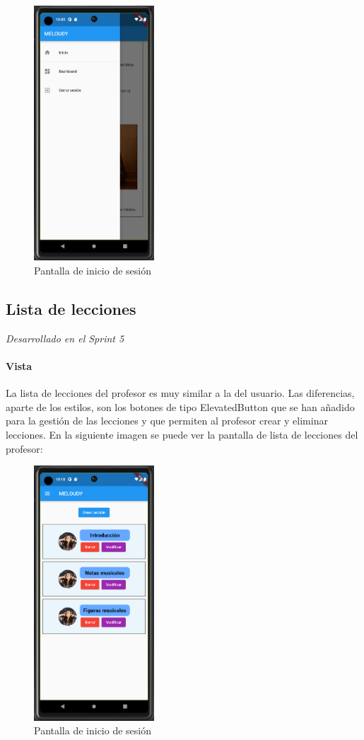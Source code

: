 \begin{figure}[H]
  \centering
  \includegraphics[width=0.4\textwidth]{imagenes/c7/drawer.png}
  \caption{Pantalla de inicio de sesión}
  \label{fig:login}
\end{figure}


\subsection{Lista de lecciones} 
\textit{Desarrollado en el Sprint 5}

\paragraph*{Vista}
La lista de lecciones del profesor es muy similar a la del usuario. Las diferencias, aparte de los estilos, son los botones de tipo ElevatedButton que se han añadido para la gestión de las lecciones y que permiten al profesor crear y eliminar lecciones. En la siguiente imagen se puede ver la pantalla de lista de lecciones del profesor:

\begin{figure}[H]
  \centering
  \includegraphics[width=0.4\textwidth]{imagenes/c7/listalecciones.png}
  \caption{Pantalla de inicio de sesión}
  \label{fig:login}
\end{figure}